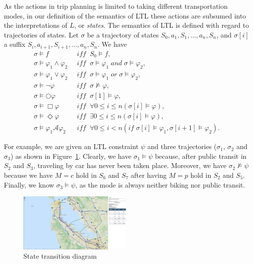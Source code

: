 \documentclass[letterpaper]{article}
\newcommand{\cA}{\mathcal{A}}
\newcommand{\tit}[1]{\textit{#1}}
\newcommand{\IFF}{\textit{iff}}
\newcommand{\IF}{\textit{if}}
\newcommand{\figref}[1]{Figure~\ref{fig:#1}}
\begin{document}
As the actions in trip planning is limited to taking different transportation modes,
in our definition of the semantics of LTL
these actions are subsumed into the interpretations of $L$, or \tit{states}.
The semantics of LTL is defined with regard to trajectories of states. 
Let $\sigma$ be a trajectory of states $S_0,a_1,S_1,\ldots,a_n,S_n$, and
$\sigma[i]$ a suffix $S_i, a_{i+1}, S_{i+1}, \ldots,a_n,S_n$.  We have
\begin{align*}
	\sigma \models f \;\; &\IFF \;\; S_0 \models f,\\
	\sigma \models \varphi_1 \land \varphi_2 \;\; &\IFF \;\; \sigma \models \varphi_1 \; and \; \sigma \models \varphi_2,\\
	\sigma \models \varphi_1 \lor \varphi_2 \;\; &\IFF \;\; \sigma \models \varphi_1 \; or \; \sigma \models \varphi_2,\\
	\sigma \models \neg \varphi \;\; &\IFF \;\; \sigma \not \models \varphi,\\
	\sigma \models \bigcirc \varphi \;\; &\IFF \;\; \sigma[1] \models \varphi,\\
	\sigma \models \Box \varphi \;\; &\IFF \;\; \forall 0 \leq i \leq n (\sigma[i] \models \varphi),\\
	\sigma \models \Diamond \varphi \;\; &\IFF \;\; \exists 0 \leq i \leq n (\sigma[i] \models \varphi),\\
	\sigma \models \varphi_1 \cA \varphi_2 \;\; &\IFF \;\; \forall 0 \leq i < n (\IF \; \sigma[i] \models \varphi_1, \sigma[i+1] \models \varphi_2).
\end{align*}

For example, we are given an LTL constraint $\psi$ and three trajectories ($\sigma_1$, $\sigma_2$ and $\sigma_3$)
as shown in \figref{trjs}.
Clearly, we have $\sigma_1 \models \psi$ because, after public transit in $S_2$ and $S_3$, 
traveling by car has never been taken place.
Moreover, we have $\sigma_2 \not \models \psi$ because we have $M=c$ hold in $S_6$ and $S_7$
after having $M=p$ hold in $S_2$ and $S_5$.
Finally, we know $\sigma_3 \models \psi$, as the mode is always neither biking nor public transit.

\begin{figure}[!ht]
  \centering
    \includegraphics[width=0.5\textwidth]{figs/result1.png}
  \caption{State transition diagram\label{fig:trjs}}
\end{figure}
\end{document}
